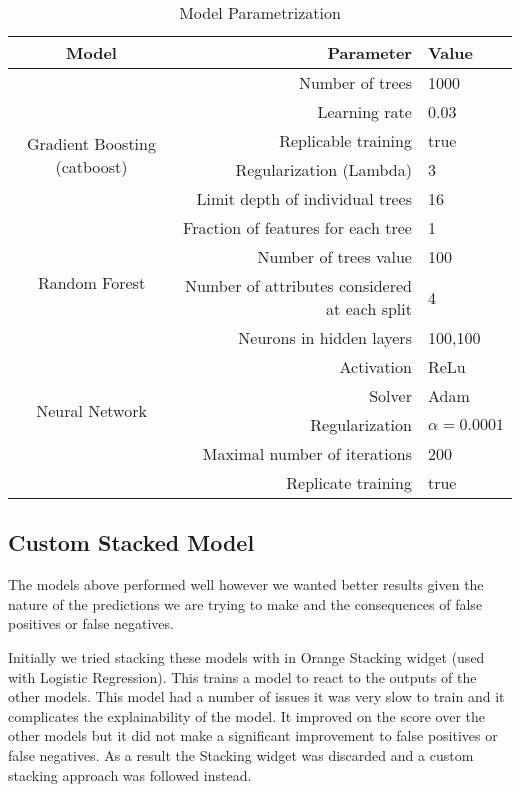 \begin{table}[H]
    \centering
    \caption{Model Parametrization}
    \label{tab:model_parameters}
    \begin{tabular}{crl} \hline 
        \textbf{Model} & \textbf{Parameter} & \textbf{Value} \\ \hline\hline
        \multirow{6}{*}{Gradient Boosting (catboost)} &  Number of trees & 1000 \\ 
          & Learning rate & 0.03 \\
          & Replicable training & true \\
          & Regularization (Lambda) & 3 \\
          & Limit depth of individual trees & 16 \\
          & Fraction of features for each tree & 1 \\ \hline 
        \multirow{2}{*}{Random Forest} &  Number of trees value & 100 \\ 
          & Number of attributes considered at each split & 4 \\ \hline 
        \multirow{6}{*}{Neural Network} &  Neurons in hidden layers & 100,100 \\ 
          & Activation & ReLu \\ 
          & Solver & Adam \\
          & Regularization & $\alpha = 0.0001$ \\ 
          & Maximal number of iterations & 200 \\ 
          & Replicate training & true \\ \hline 
    \end{tabular}
\end{table}

\subsection{Custom Stacked Model}

The models above performed well however we wanted better results given the nature of the 
predictions we are trying to make and the consequences of false positives or false negatives.

Initially we tried stacking these models with in Orange Stacking widget
(used with Logistic Regression).
This trains a model to react to the outputs of the other models. 
This model had a number of issues
it was very slow to train and it complicates the explainability of the model.
 It
improved on the score over the other models but it did not make a 
significant improvement to false positives
or false negatives. As a result the Stacking widget was discarded and a
custom stacking approach was followed instead.

